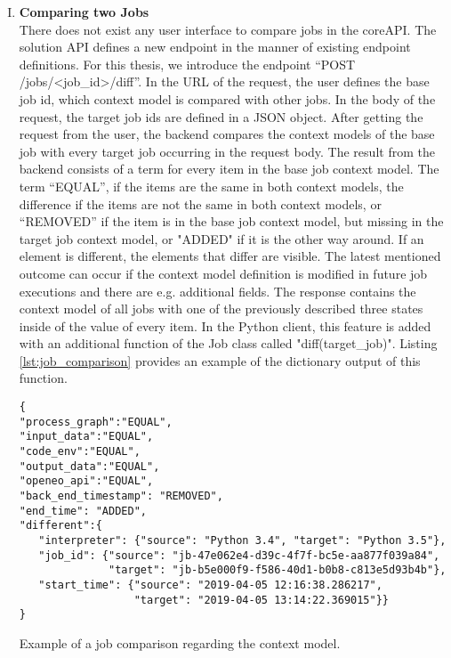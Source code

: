 \documentclass[draft,final]{vutinfth} %
\begin{document}
\begin{enumerate}[I.]
\item \textbf{Comparing two Jobs} \\
	There does not exist any user interface to compare jobs in the coreAPI. The solution API defines a new endpoint in the manner of existing endpoint definitions. For this thesis, we introduce the endpoint  “POST /jobs/<job\_id>/diff”. In the URL of the request, the user defines the base job id, which context model is compared with other jobs. In the body of the request, the target job ids are defined in a JSON object. After getting the request from the user, the backend compares the context models of the base job with every target job occurring in the request body. The result from the backend consists of a term for every item in the base job context model. The term “EQUAL”, if the items are the same in both context models, the difference if the items are not the same in both context models, or {“REMOVED”} if the item is in the base job context model, but missing in the target job context model, or {"ADDED" if it is} the other way around. If an element is different, the elements that differ are visible. The latest mentioned outcome can occur if the context model definition is modified in future job executions and there are e.g. additional fields. The response contains the context model of all jobs with one of the previously described three states inside of the value of every item. In the Python client, this feature is added with an additional function of the Job class called "diff(target\_job)". Listing \ref{lst:job_comparison} provides an example of the dictionary output of this function.
\begin{listing}[ht]
	\begin{verbatim}
{
"process_graph":"EQUAL",
"input_data":"EQUAL",
"code_env":"EQUAL",
"output_data":"EQUAL",
"openeo_api":"EQUAL",
"back_end_timestamp": "REMOVED",
"end_time": "ADDED",
"different":{
   "interpreter": {"source": "Python 3.4", "target": "Python 3.5"},
   "job_id": {"source": "jb-47e062e4-d39c-4f7f-bc5e-aa877f039a84", 
              "target": "jb-b5e000f9-f586-40d1-b0b8-c813e5d93b4b"},
   "start_time": {"source": "2019-04-05 12:16:38.286217",
                  "target": "2019-04-05 13:14:22.369015"}}
}
	\end{verbatim}
	\caption{Example of a job comparison regarding the context model.}
	\label{lst:job_comparison}
\end{listing}	


\end{enumerate}
\end{document}
